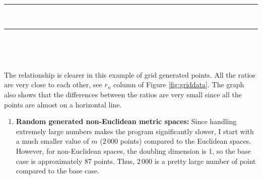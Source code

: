 \documentclass[12pt,english,]{article}
\providecommand{\tightlist}{%
  \setlength{\itemsep}{0pt}\setlength{\parskip}{0pt}}
\let\origfigure\figure
\let\endorigfigure\endfigure
\renewenvironment{figure}[1][2] {
    \expandafter\origfigure\expandafter[H]
} {
    \endorigfigure
}
\begin{document}
\hrule

~

\begin{figure}
\begin{minipage}{0.95\textwidth}
\begin{center}
\end{center}
\end{minipage}
\caption[Caption]{The graph of ratios $r_n$ versus different values of $n$ of grid points with $n \in \{200\,000, 400\,000, 800\,000, 1\,600\,000, 3\,200\,000\}$ (with y-scale = $10^{-3}$).}
\label{fig:gridgraph}
\end{figure}

\hrule

~

~

The relationship is clearer in this example of grid generated points.
All the ratios are very close to each other, see \(r_n\) column of
Figure \ref{fig:griddata}. The graph also shows that the differences
between the ratios are very small since all the points are almost on a
horizontal line.

\begin{enumerate}
\def\labelenumi{\arabic{enumi}.}
\setcounter{enumi}{2}
\tightlist
\item
  \textbf{Random generated non-Euclidean metric spaces:} Since handling
  extremely large numbers makes the program significantly slower, I
  start with a much smaller value of \(m\) (\(2\,000\) points) compared
  to the Euclidean spaces. However, for non-Euclidean spaces, the
  doubling dimension is 1, so the base case is approximately 87 points.
  Thus, \(2\,000\) is a pretty large number of point compared to the
  base case.
\end{enumerate}
\end{document}
